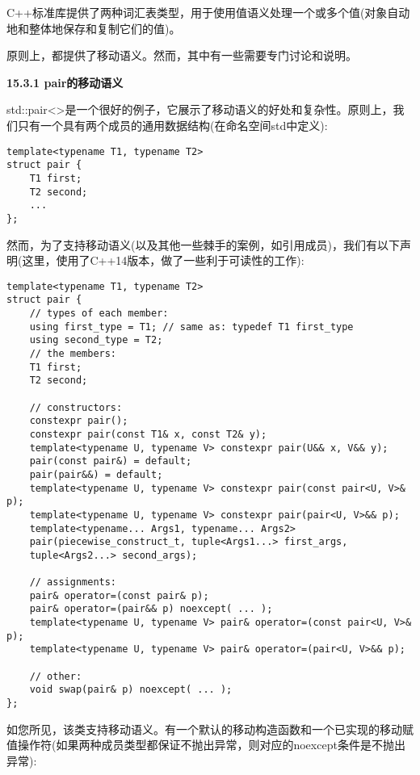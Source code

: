 C++标准库提供了两种词汇表类型，用于使用值语义处理一个或多个值(对象自动地和整体地保存和复制它们的值)。\par

原则上，都提供了移动语义。然而，其中有一些需要专门讨论和说明。\par

\hspace*{\fill} \par %
\textbf{15.3.1 pair的移动语义}

std::pair<>是一个很好的例子，它展示了移动语义的好处和复杂性。原则上，我们只有一个具有两个成员的通用数据结构(在命名空间std中定义):\par

\begin{lstlisting}[caption={}]
template<typename T1, typename T2>
struct pair {
	T1 first;
	T2 second;
	...
};
\end{lstlisting}

然而，为了支持移动语义(以及其他一些棘手的案例，如引用成员)，我们有以下声明(这里，使用了C++14版本，做了一些利于可读性的工作):\par

\begin{lstlisting}[caption={}]
template<typename T1, typename T2>
struct pair {
	// types of each member:
	using first_type = T1; // same as: typedef T1 first_type
	using second_type = T2;
	// the members:
	T1 first;
	T2 second;
	
	// constructors:
	constexpr pair();
	constexpr pair(const T1& x, const T2& y);
	template<typename U, typename V> constexpr pair(U&& x, V&& y);
	pair(const pair&) = default;
	pair(pair&&) = default;
	template<typename U, typename V> constexpr pair(const pair<U, V>& p);
	template<typename U, typename V> constexpr pair(pair<U, V>&& p);
	template<typename... Args1, typename... Args2>
	pair(piecewise_construct_t, tuple<Args1...> first_args,
	tuple<Args2...> second_args);
	
	// assignments:
	pair& operator=(const pair& p);
	pair& operator=(pair&& p) noexcept( ... );
	template<typename U, typename V> pair& operator=(const pair<U, V>& p);
	template<typename U, typename V> pair& operator=(pair<U, V>&& p);
	
	// other:
	void swap(pair& p) noexcept( ... );
};
\end{lstlisting}

如您所见，该类支持移动语义。有一个默认的移动构造函数和一个已实现的移动赋值操作符(如果两种成员类型都保证不抛出异常，则对应的noexcept条件是不抛出异常):\par

